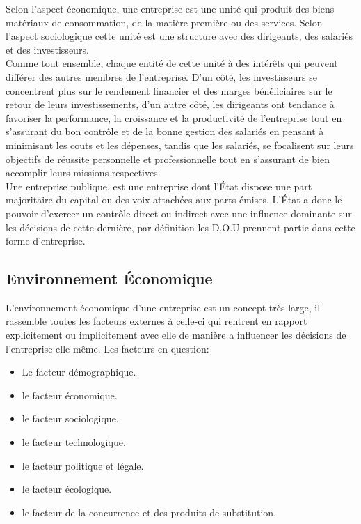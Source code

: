 Selon l'aspect économique, une entreprise est une unité qui produit des biens matériaux de consommation, de la matière première ou des services. Selon l'aspect sociologique cette unité est une structure avec des dirigeants, des salariés et des investisseurs.\\ 

Comme tout ensemble, chaque entité de cette unité à des intérêts qui peuvent différer des autres membres de l'entreprise. D'un côté, les investisseurs se concentrent plus sur le rendement financier et des marges bénéficiaires sur le retour de leurs investissements, d'un autre côté, les dirigeants ont tendance à favoriser la performance, la croissance et la productivité de l'entreprise tout en s'assurant du bon contrôle et de la bonne gestion des salariés en pensant à minimisant les couts et les dépenses, tandis que les salariés, se focalisent sur leurs objectifs de réussite personnelle et professionnelle tout en s'assurant de bien accomplir leurs missions respectives.\\

Une entreprise publique, est une entreprise dont l'État dispose une part majoritaire du capital ou des voix attachées aux parts émises. L'État a donc le pouvoir d'exercer un contrôle direct ou indirect avec une influence dominante sur les décisions de cette dernière\cite{def-entreprise-pub}, par définition les \acs{D.O.U} prennent partie dans cette forme d'entreprise.\\

\subsection{Environnement Économique}
L'environnement économique d'une entreprise\cite{env-entreprise} est un concept très large, il rassemble toutes les facteurs externes à celle-ci qui rentrent en rapport explicitement ou implicitement avec elle de manière a influencer les décisions de l'entreprise elle même. Les facteurs en question:\\

\begin{itemize}
    \item Le facteur démographique.
    \item le facteur économique.
    \item le facteur sociologique.
    \item le facteur technologique.
    \item le facteur politique et légale.
    \item le facteur écologique.
    \item le facteur de la concurrence et des produits de substitution.\\
\end{itemize}


